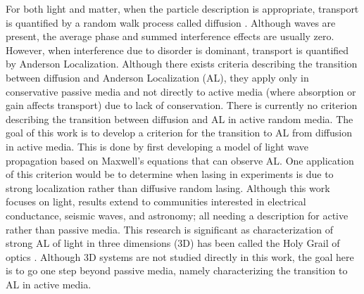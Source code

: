 For both light and matter, when the particle description is appropriate, transport is quantified by a random walk  process called diffusion \cite{2005_Duan_Guojun} \cite{2006_Sheng}. Although waves  are present, the average phase and summed interference effects are usually zero. However, when interference due to disorder is dominant, transport is quantified by Anderson Localization. 
Although there exists criteria describing the transition between diffusion and Anderson Localization (AL), they apply only in conservative passive media and not directly to active media (where absorption\cite{1998_Brouwer} or gain affects transport) due to lack of conservation. There is currently no criterion describing the transition between diffusion and AL in active random media.
The goal of this work is to develop a criterion for the transition to AL from diffusion in active media.%
This is done by first developing a model of light wave propagation based on Maxwell's equations \cite{1999_Jackson} that can observe AL. 
One application of this criterion would be to determine when lasing in experiments \cite{1999_Cao_RandomLaserPRL} is due to strong localization rather than diffusive random lasing\cite{2008_Wiersma}. Although this work focuses on light, results extend to communities interested in electrical conductance, seismic waves, and astronomy; all needing a description for active rather than passive media. This research is significant as characterization of strong AL of light in three dimensions (3D) has been called the Holy Grail  of optics \cite{1998_POAN}. Although 3D systems are not studied directly in this work, the goal here is to go one step beyond passive media, namely characterizing the transition to AL in active media. 

